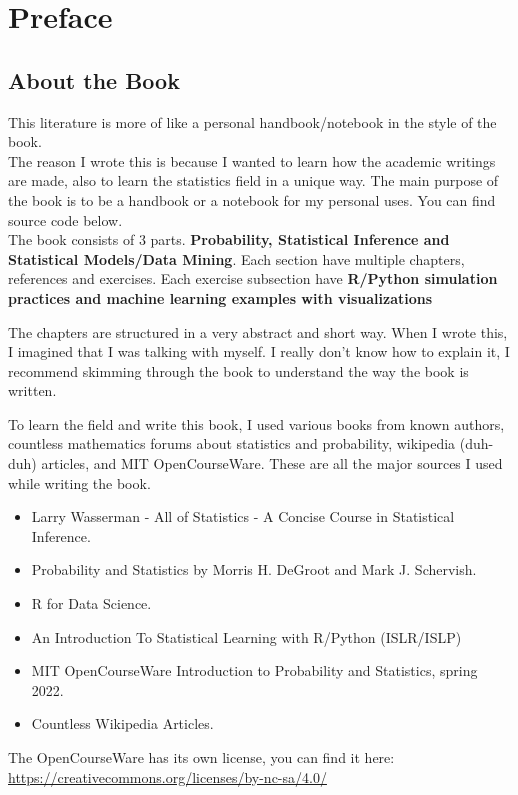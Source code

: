 \chapter*{Preface}

\section*{About the Book}
This literature is more of like a personal handbook/notebook in the style of the book. \\
The reason I wrote this is because I wanted to learn how the academic writings are made, also to learn the statistics field in a unique way. The main purpose of the book is to be a handbook or a notebook for my personal uses. You can find source code below.\\
The book consists of $3$ parts. \textbf{Probability, Statistical Inference and Statistical Models/Data Mining}. Each section have multiple chapters, references and exercises. Each exercise subsection have \textbf{R/Python simulation practices and machine learning examples with visualizations}
\par
The chapters are structured in a very abstract and short way. When I wrote this, I imagined that I was talking with myself. I really don't know how to explain it, I recommend skimming through the book to understand the way the book is written.
\par
To learn the field and write this book, I used various books from known authors, countless mathematics forums about statistics and probability, wikipedia (duh-duh) articles, and MIT OpenCourseWare. These are all the major sources I used while writing the book.
\begin{itemize}
    \item Larry Wasserman - All of Statistics - A Concise Course in Statistical Inference.
    \item Probability and Statistics by Morris H. DeGroot and Mark J. Schervish.
    \item R for Data Science.
    \item An Introduction To Statistical Learning with R/Python (ISLR/ISLP)
    \item MIT OpenCourseWare Introduction to Probability and Statistics, spring 2022.
    \item Countless Wikipedia Articles.
\end{itemize}

The OpenCourseWare has its own license, you can find it here: \url{https://creativecommons.org/licenses/by-nc-sa/4.0/}


